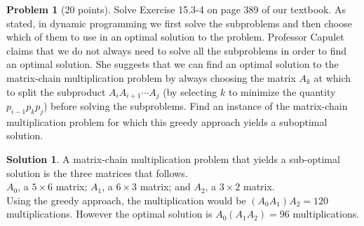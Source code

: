 \documentclass{article}
\theoremstyle{definition}
\newtheorem{problem}{Problem}
\newtheorem*{solution}{Solution}
\begin{document}
\clearpage
\begin{problem}[20 points]
  Solve Exercise 15.3-4 on page 389 of our textbook. As stated, in
  dynamic programming we first solve the subproblems and then choose
  which of them to use in an optimal solution to the
  problem. Professor Capulet claims that we do not always need to
  solve all the subproblems in order to find an optimal solution. She
  suggests that we can find an optimal solution to the matrix-chain
  multiplication problem by always choosing the matrix $A_k$
  at which to split the subproduct $A_iA_{i+1}\cdots A_j$ (by selecting $k$ to minimize the
  quantity $p_{i-1}p_kp_j$) before solving the subproblems. Find an instance
  of the matrix-chain multiplication problem for which this greedy
  approach yields a suboptimal solution.
\end{problem}
\begin{solution}
A matrix-chain multiplication problem that yields a sub-optimal solution is the three matrices that follows.\\
$A_0$, a $5\times6$ matrix; $A_1$, a $6\times3$ matrix; and $A_2$, a $3\times2$ matrix.\\
Using the greedy approach, the multiplication would be $(A_0A_1)A_2=120$ multiplications. However the optimal solution is $A_0(A_1A_2)=96$ multiplications.
\end{solution}
\end{document}
